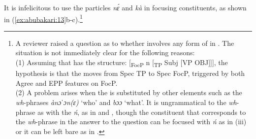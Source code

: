 \documentclass[output=paper,modfonts,nonflat,
\ChapterDOI{10.5281/zenodo.3367154}
 hidelinks
]{langsci/langscibook}
\begin{document}
\newpage 
 It is infelicitous to use the particles \textit{nɛ́} and \textit{kà} in focusing  constituents, as shown in (\ref{ex:abubakari:13}b-c).\footnote{A 
    reviewer raised a question as to whether   involves any form of  in . The situation is not immediately clear for the following reasons: \\
    (1) Assuming that   has the structure: [\textsubscript{FocP} n [\textsubscript{TP} Subj [VP OBJ]]], the hypothesis is that the  moves from Spec TP to Spec FocP, triggered by both Agree and EPP features on FocP. \\
    (2) A problem arises when the  is substituted by other elements such as the \textit{wh}-phrases \textit{ànɔˈ}\textit{ɔn(ɛ)} ‘who’ and \textit{bɔɔ} ‘what’. It is ungrammatical to  the \textit{wh}-phrase as  with the   \textit{ń}, as in  and , though the constituent that corresponds to the \textit{wh}-phrase in the answer to the question can be focused with \textit{ń} as in (iii) or it can be left bare as in .\vspace*{-2mm}
    
}
\end{document}
